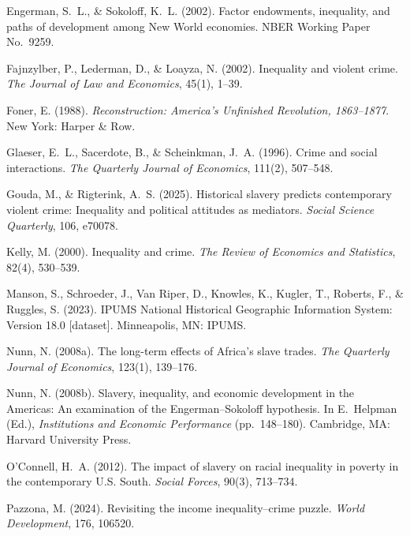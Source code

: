 \documentclass[12pt]{article}
\begin{document}
\begin{thebibliography}{}
Engerman, S.~L., \& Sokoloff, K.~L. (2002).
Factor endowments, inequality, and paths of development among New World economies.
NBER Working Paper No.~9259.

Fajnzylber, P., Lederman, D., \& Loayza, N. (2002).
Inequality and violent crime.
\textit{The Journal of Law and Economics}, 45(1), 1--39.

Foner, E. (1988).
\textit{Reconstruction: America's Unfinished Revolution, 1863--1877}.
New York: Harper \& Row.

Glaeser, E.~L., Sacerdote, B., \& Scheinkman, J.~A. (1996).
Crime and social interactions.
\textit{The Quarterly Journal of Economics}, 111(2), 507--548.

Gouda, M., \& Rigterink, A.~S. (2025).
Historical slavery predicts contemporary violent crime: Inequality and political attitudes as mediators.
\textit{Social Science Quarterly}, 106, e70078.

Kelly, M. (2000).
Inequality and crime.
\textit{The Review of Economics and Statistics}, 82(4), 530--539.

Manson, S., Schroeder, J., Van Riper, D., Knowles, K., Kugler, T., Roberts, F., \& Ruggles, S. (2023).
IPUMS National Historical Geographic Information System: Version 18.0 [dataset].
Minneapolis, MN: IPUMS.

Nunn, N. (2008a).
The long-term effects of Africa's slave trades.
\textit{The Quarterly Journal of Economics}, 123(1), 139--176.

Nunn, N. (2008b).
Slavery, inequality, and economic development in the Americas: An examination of the Engerman--Sokoloff hypothesis.
In E.~Helpman (Ed.), \textit{Institutions and Economic Performance} (pp.~148--180). Cambridge, MA: Harvard University Press.

O'Connell, H.~A. (2012).
The impact of slavery on racial inequality in poverty in the contemporary U.S. South.
\textit{Social Forces}, 90(3), 713--734.

Pazzona, M. (2024).
Revisiting the income inequality--crime puzzle.
\textit{World Development}, 176, 106520.


\end{thebibliography}
\end{document}
